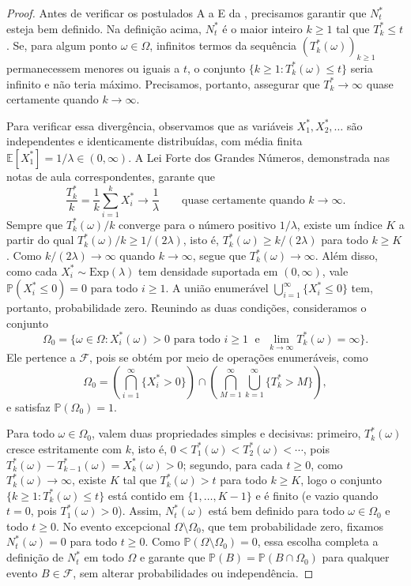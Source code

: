\documentclass[12pt,portuguese]{article}
\theoremstyle{definition}
\theoremstyle{plainexercise}
\theoremstyle{starredexercise}
\theoremstyle{definition}
\begin{document}
\begin{proof}
Antes de verificar os postulados A a E da ,
precisamos garantir que $N_t^*$ esteja bem definido. Na definição acima,
$N_t^*$ é o maior inteiro $k\geqslant1$ tal que $T_k^*\leqslant t$. Se, para
algum ponto $\omega\in\Omega$, infinitos termos da sequência $(T_k^*(\omega))_{k\geqslant1}$
permanecessem menores ou iguais a $t$, o conjunto $\{k\geqslant1:T_k^*(\omega)\leqslant t\}$
seria infinito e não teria máximo. Precisamos, portanto, assegurar que
$T_k^*\to\infty$ quase certamente quando $k\to\infty$.

Para verificar essa divergência, observamos que as variáveis $X_1^*,X_2^*,\ldots$
são independentes e identicamente distribuídas, com média finita
$\mathbb{E}[X_1^*]=1/\lambda\in(0,\infty)$. A Lei Forte dos Grandes Números,
demonstrada nas notas de aula correspondentes, garante que
\[
  \frac{T_k^*}{k}=\frac{1}{k}\sum_{i=1}^{k}X_i^*
  \longrightarrow\frac{1}{\lambda}
  \qquad\text{quase certamente quando }k\to\infty.
\]
Sempre que $T_k^*(\omega)/k$ converge para o número positivo $1/\lambda$, existe
um índice $K$ a partir do qual $T_k^*(\omega)/k\geqslant 1/(2\lambda)$, isto é,
$T_k^*(\omega)\geqslant k/(2\lambda)$ para todo $k\geqslant K$. Como
$k/(2\lambda)\to\infty$ quando $k\to\infty$, segue que $T_k^*(\omega)\to\infty$.
Além disso, como cada $X_i^*\sim\mathrm{Exp}(\lambda)$ tem densidade suportada em
$(0,\infty)$, vale $\mathbb{P}(X_i^*\leqslant 0)=0$ para todo $i\geqslant1$. A
união enumerável $\bigcup_{i=1}^{\infty}\{X_i^*\leqslant 0\}$ tem, portanto,
probabilidade zero. Reunindo as duas condições, consideramos o conjunto
\[
  \Omega_0
  =\bigl\{\omega\in\Omega : X_i^*(\omega)>0 \text{ para todo } i\geqslant1
  \;\text{ e }\; \lim_{k\to\infty}T_k^*(\omega)=\infty\bigr\}.
\]
Ele pertence a $\mathcal{F}$, pois se obtém por meio de operações enumeráveis,
como
\[
  \Omega_0
  =\left(\bigcap_{i=1}^{\infty}\{X_i^*>0\}\right)
   \cap\left(\bigcap_{M=1}^{\infty}\bigcup_{k=1}^{\infty}\{T_k^*>M\}\right),
\]
e satisfaz $\mathbb{P}(\Omega_0)=1$.

Para todo $\omega\in\Omega_0$, valem duas propriedades simples e decisivas:
primeiro, $T_k^*(\omega)$ cresce estritamente com $k$, isto é,
$0<T_1^*(\omega)<T_2^*(\omega)<\cdots$, pois $T_k^*(\omega)-T_{k-1}^*(\omega)=X_k^*(\omega)>0$;
segundo, para cada $t\geqslant0$, como $T_k^*(\omega)\to\infty$, existe $K$ tal que
$T_k^*(\omega)>t$ para todo $k\geqslant K$, logo o conjunto
$\{k\geqslant1:T_k^*(\omega)\leqslant t\}$ está contido em $\{1,\ldots,K-1\}$ e
é finito (e vazio quando $t=0$, pois $T_1^*(\omega)>0$). Assim, $N_t^*(\omega)$
está bem definido para todo $\omega\in\Omega_0$ e todo $t\geqslant0$. No evento
excepcional $\Omega\setminus\Omega_0$, que tem probabilidade zero, fixamos
$N_t^*(\omega)=0$ para todo $t\geqslant0$. Como $\mathbb{P}(\Omega\setminus\Omega_0)=0$,
essa escolha completa a definição de $N_t^*$ em todo $\Omega$ e garante que
$\mathbb{P}(B)=\mathbb{P}(B\cap\Omega_0)$ para qualquer evento $B\in\mathcal{F}$,
sem alterar probabilidades ou independência.


\end{proof}
\end{document}
